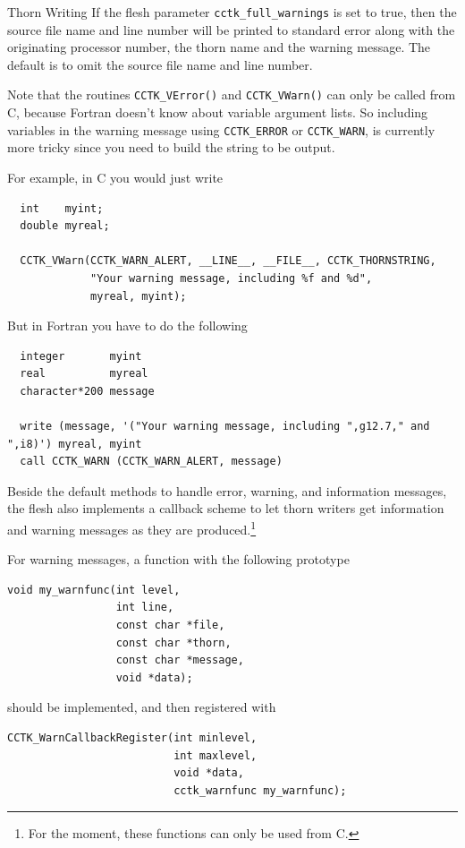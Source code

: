 \begin{cactuspart}{Thorn Writing}
If the flesh parameter \texttt{cctk\_full\_warnings} is set to true, then the
source file name and line number will be printed to standard error along with
the originating processor number, the thorn name and the warning message.
The default is to omit the source file name and line number.

Note that the routines \texttt{CCTK\_VError()} and
\texttt{CCTK\_VWarn()} can only be called from C, because
Fortran doesn't know about variable argument lists. So including variables in
the warning message using \texttt{CCTK\_ERROR} or \texttt{CCTK\_WARN},
is currently more tricky since
you need to build the string to be output.

For example, in C you would just write
\begin{verbatim}
  int    myint;
  double myreal;

  CCTK_VWarn(CCTK_WARN_ALERT, __LINE__, __FILE__, CCTK_THORNSTRING,
             "Your warning message, including %f and %d",
             myreal, myint);
\end{verbatim}

But in Fortran you have to do the following
\begin{verbatim}
  integer       myint
  real          myreal
  character*200 message

  write (message, '("Your warning message, including ",g12.7," and ",i8)') myreal, myint
  call CCTK_WARN (CCTK_WARN_ALERT, message)
\end{verbatim}

Beside the default methods to handle error, warning, and information
messages, the flesh also implements a callback scheme to let thorn
writers get information and warning messages as they are produced.\footnote{For the moment, these
functions can only be used from C.}

For warning messages, a function with the following prototype
\begin{verbatim}
void my_warnfunc(int level,
                 int line,
                 const char *file,
                 const char *thorn,
                 const char *message,
                 void *data);
\end{verbatim}
should be implemented, and then registered with 
\begin{verbatim}
CCTK_WarnCallbackRegister(int minlevel,
                          int maxlevel,
                          void *data,
                          cctk_warnfunc my_warnfunc);
\end{verbatim}


\end{cactuspart}
